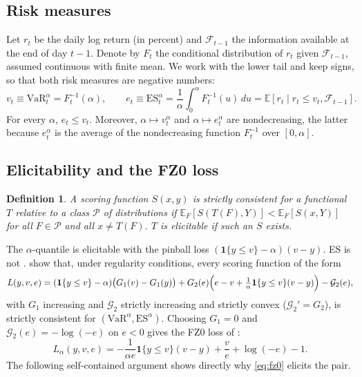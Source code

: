\documentclass[11pt]{article}
\newtheorem{definition}{Definition}
\theoremstyle{remark}
\newcommand{\1}{\mathbf{1}}
\newcommand{\E}{\mathbb{E}}
\newcommand{\F}{\mathcal{F}}
\newcommand{\VaR}{\mathrm{VaR}}
\newcommand{\ES}{\mathrm{ES}}
\begin{document}
\subsection{Risk measures}
Let $r_t$ be the daily log return (in percent) and $\F_{t-1}$ the information available at the end of day $t-1$. Denote by $F_t$ the conditional distribution of $r_t$ given $\F_{t-1}$, assumed continuous with finite mean. We work with the lower tail and keep signs, so that both risk measures are negative numbers:
\begin{equation}
v_t \equiv \VaR_t^\alpha = F_t^{-1}(\alpha),\qquad
e_t \equiv \ES_t^\alpha = \frac{1}{\alpha}\int_0^\alpha F_t^{-1}(u)\,du = \E\left[r_t \mid r_t\le v_t,\F_{t-1}\right].
\end{equation}
For every $\alpha$, $e_t\le v_t$. Moreover, $\alpha\mapsto v_t^\alpha$ and $\alpha\mapsto e_t^\alpha$ are nondecreasing, the latter because $e_t^\alpha$ is the average of the nondecreasing function $F_t^{-1}$ over $[0,\alpha]$.

\subsection{Elicitability and the FZ0 loss}
\begin{definition}
A scoring function $S(x,y)$ is \emph{strictly consistent} for a functional $T$ relative to a class $\mathcal{P}$ of distributions if $\E_F[S(T(F),Y)]<\E_F[S(x,Y)]$ for all $F\in\mathcal{P}$ and all $x\neq T(F)$. $T$ is \emph{elicitable} if such an $S$ exists.
\end{definition}
The $\alpha$-quantile is elicitable with the pinball loss $(\1\{y\le v\}-\alpha)(v-y)$. ES is not \citep{gneiting2011making}. \citet{fissler2016higher} show that, under regularity conditions, every scoring function of the form
\begin{equation}\label{eq:fzclass}
L(y,v,e)=(\1\{y\le v\}-\alpha)\bigl(G_1(v)-G_1(y)\bigr)+G_2(e)\Bigl(e-v+\tfrac{1}{\alpha}\1\{y\le v\}(v-y)\Bigr)-\mathcal{G}_2(e),
\end{equation}
with $G_1$ increasing and $\mathcal{G}_2$ strictly increasing and strictly convex ($\mathcal{G}_2'=G_2$), is strictly consistent for $(\VaR^\alpha,\ES^\alpha)$. Choosing $G_1=0$ and $\mathcal{G}_2(e)=-\log(-e)$ on $e<0$ gives the FZ0 loss of \citet{patton2019dynamic}:
\begin{equation}\label{eq:fz0}
L_{\alpha}(y,v,e)=-\frac{1}{\alpha e}\1\{y\le v\}(v-y)+\frac{v}{e}+\log(-e)-1 .
\end{equation}
The following self-contained argument shows directly why \eqref{eq:fz0} elicits the pair.
\end{document}
